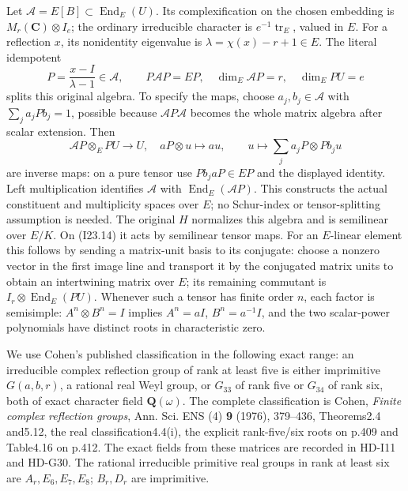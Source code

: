 Let \(\mathcal A=E[B]\subset\operatorname{End}_E(U)\).
Its complexification on the chosen embedding is
\(M_r(\mathbf C)\otimes I_e\); the ordinary irreducible
character is \(e^{-1}\operatorname{tr}_E\), valued in \(E\).
For a reflection \(x\), its nonidentity eigenvalue is
\(\lambda=\chi(x)-r+1\in E\). The literal idempotent
\[
 P=\frac{x-I}{\lambda-1}\in\mathcal A,
 \qquad P\mathcal AP=EP,\quad
 \dim_E\mathcal AP=r,\quad \dim_EPU=e                         \tag{I23.13}
\]
splits this original algebra. To specify the maps, choose
\(a_j,b_j\in\mathcal A\) with \(\sum_j a_jPb_j=1\),
possible because \(\mathcal AP\mathcal A\) becomes the whole
matrix algebra after scalar extension. Then
\[
 \mathcal AP\otimes_EPU\longrightarrow U,\quad aP\otimes u\mapsto au,
 \qquad u\longmapsto\sum_j a_jP\otimes Pb_ju                 \tag{I23.14}
\]
are inverse maps: on a pure tensor use
\(Pb_jaP\in EP\) and the displayed identity. Left multiplication
identifies \(\mathcal A\) with
\(\operatorname{End}_E(\mathcal AP)\). This constructs the
actual constituent and multiplicity spaces over \(E\); no
Schur-index or tensor-splitting assumption is needed.
The original \(H\) normalizes this algebra and is semilinear
over \(E/K\). On (I23.14) it acts by semilinear tensor maps.
For an \(E\)-linear element this follows by sending a matrix-unit
basis to its conjugate: choose a nonzero vector in the first
image line and transport it by the conjugated matrix units to
obtain an intertwining matrix over \(E\); its remaining
commutant is \(I_r\otimes\operatorname{End}_E(PU)\).
Whenever such a tensor has finite order \(n\), each factor
is semisimple: \(A^n\otimes B^n=I\) implies
\(A^n=aI\), \(B^n=a^{-1}I\), and the two scalar-power
polynomials have distinct roots in characteristic zero.

We use Cohen's published classification in the following exact
range: an irreducible complex reflection group of rank at least
five is either imprimitive \(G(a,b,r)\), a rational real Weyl
group, or \(G_{33}\) of rank five or \(G_{34}\) of rank six,
both of exact character field \(\mathbf Q(\omega)\).
The complete classification is Cohen, \emph{Finite complex
reflection groups}, Ann. Sci. ENS (4) \textbf{9} (1976),
379--436, Theorems2.4 and5.12, the real classification4.4(i),
the explicit rank-five/six roots on p.409 and Table4.16 on p.412.
The exact fields from these matrices are recorded in HD-I11
and HD-G30. The rational irreducible primitive real groups in
rank at least six are \(A_r,E_6,E_7,E_8\); \(B_r,D_r\)
are imprimitive.

